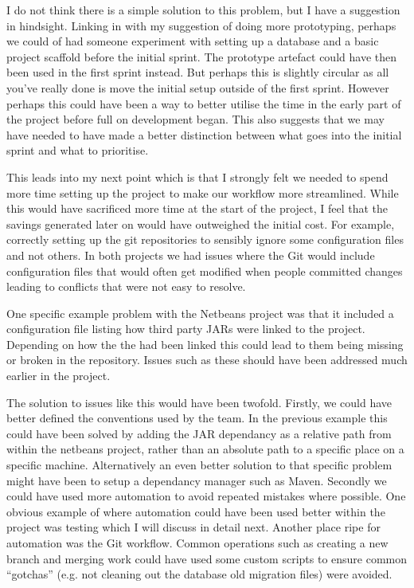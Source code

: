 \documentclass[paper=a4, fontsize=11pt]{scrartcl}	%
\numberwithin{equation}{section}															%
\numberwithin{figure}{section}																%
\numberwithin{table}{section}
\begin{document}
I do not think there is a simple solution to this problem, but I have a suggestion in hindsight. Linking in with my suggestion of doing more prototyping, perhaps we could of had someone experiment with setting up a database and a basic project scaffold before the initial sprint. The prototype artefact could have then been used in the first sprint instead. But perhaps this is slightly circular as all you've really done is move the initial setup outside of the first sprint. However perhaps this could have been a way to better utilise the time in the early part of the project before full on development began. This also suggests that we may have needed to have made a better distinction between what goes into the initial sprint and what to prioritise.

This leads into my next point which is that I strongly felt we needed to spend more time setting up the project to make our workflow more streamlined. While this would have sacrificed more time at the start of the project, I feel that the savings generated later on would have outweighed the initial cost. For example, correctly setting up the git repositories to sensibly ignore some configuration files and not others. In both projects we had issues where the Git would include configuration files that would often get modified when people committed changes leading to conflicts that were not easy to resolve. 

One specific example problem with the Netbeans project was that it included a configuration file listing how third party JARs were linked to the project. Depending on how the the had been linked this could lead to them being missing or broken in the repository. Issues such as these should have been addressed much earlier in the project. 

The solution to issues like this would have been twofold. Firstly, we could have better defined the conventions used by the team. In the previous example this could have been solved by adding the JAR dependancy as a relative path from within the netbeans project, rather than an absolute path to a specific place on a specific machine. Alternatively an even better solution to that specific problem might have been to setup a dependancy manager such as Maven. Secondly we could have used more automation to avoid repeated mistakes where possible. One obvious example of where automation could have been used better within the project was testing which I will discuss in detail next. Another place ripe for automation was the Git workflow. Common operations such as creating a new branch and merging work could have used some custom scripts to ensure common ``gotchas'' (e.g. not cleaning out the database old migration files) were avoided.
\end{document}
